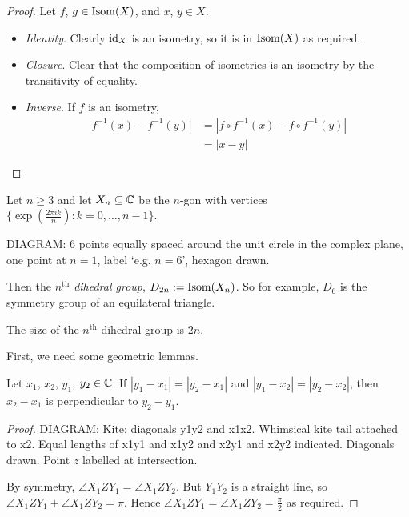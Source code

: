 \documentclass{../template/note}
\begin{document}
    \begin{proof}
        Let \(f\), \(g \in \operatorname{Isom}(X)\), and \(x\), \(y \in X\).
        \begin{itemize}
            \item \emph{Identity}. Clearly \(\operatorname{id}_X\) is an isometry, so it is in \(\operatorname{Isom}(X)\) as required.
            \item \emph{Closure}. Clear that the composition of isometries is an isometry by the transitivity of equality.
            \item \emph{Inverse}. If \(f\) is an isometry,
            \begin{align*}
                |f^{-1}(x) - f^{-1}(y)| &= |f \circ f^{-1}(x) - f \circ f^{-1}(y)| \\
                &= |x - y|
            \end{align*}
        \end{itemize}
    \end{proof}
    
    \begin{definition}
        Let \(n \geq 3\) and let \(X_n \subseteq \mathbb C\) be the \(n\)-gon with vertices \(\{\exp(\frac{2 \pi i k}{n}) : k = 0, \dots, n-1\}\).

        DIAGRAM: \(6\) points equally spaced around the unit circle in the complex plane, one point at \(n=1\), label `e.g. \(n=6\)', hexagon drawn.

        Then the \emph{\(n^\text{th}\) dihedral group}, \(D_{2n} := \operatorname{Isom}(X_n)\). So for example, \(D_6\) is the symmetry group of an equilateral triangle.
    \end{definition}
    
    \begin{theorem}
        The size of the \(n^\text{th}\) dihedral group is \(2n\).
    \end{theorem}
    
    First, we need some geometric lemmas.

    \begin{lemma}
        Let \(x_1\), \(x_2\), \(y_1\), \(y_2 \in \mathbb C\). If \(|y_1-x_1| = |y_2-x_1|\) and \(|y_1-x_2| = |y_2-x_2|\), then \(x_2-x_1\) is perpendicular to \(y_2-y_1\).
    \end{lemma}
    
    \begin{proof}
        DIAGRAM: Kite: diagonals y1y2 and x1x2. Whimsical kite tail attached to x2. Equal lengths of x1y1 and x1y2 and x2y1 and x2y2 indicated. Diagonals drawn. Point \(z\) labelled at intersection.

        By symmetry, \(\angle X_1 Z Y_1 = \angle X_1 Z Y_2\). But \(Y_1Y_2\) is a straight line, so \(\angle X_1 Z Y_1 + \angle X_1 Z Y_2 = \pi\). Hence \(\angle X_1 Z Y_1 = \angle X_1 Z Y_2 = \frac \pi 2\) as required.
    \end{proof}
    
\end{document}
